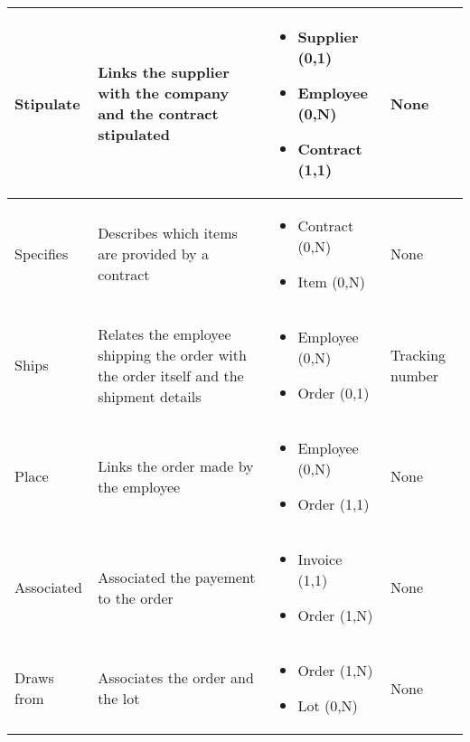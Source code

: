 \begin{longtable}{|p{}|p{} |p{}|p{} |}
Stipulate & Links the supplier with the company and the contract stipulated  & \begin{itemize}
	\vspace{-1em}
	\item Supplier (0,1) 
	\item Employee (0,N)
    \item Contract  (1,1)
	\end{itemize}
&  None\\\hline

Specifies & Describes which items are provided by a contract  & \begin{itemize}
	\vspace{-1em}
	\item Contract (0,N)
	\item Item (0,N)
	\end{itemize}
&  None\\\hline

Ships & Relates the employee shipping the order with the order itself and the shipment details & \begin{itemize}
	\vspace{-1em}
	\item Employee (0,N)
	\item Order (0,1)
\end{itemize}
&  Tracking number \\\hline

Place & Links the order made by the employee & \begin{itemize}
	\vspace{-1em}
	\item Employee (0,N)
	\item Order (1,1)
\end{itemize}
&  None \\\hline

Associated & Associated the payement to the order & \begin{itemize}
	\vspace{-1em}
	\item Invoice (1,1)
	\item Order (1,N)
\end{itemize}
&  None \\\hline

Draws from & Associates the order and the lot & \begin{itemize}
	\vspace{-1em}
	\item Order (1,N)
	\item Lot (0,N)
\end{itemize}
&  None \\\hline

\end{longtable}